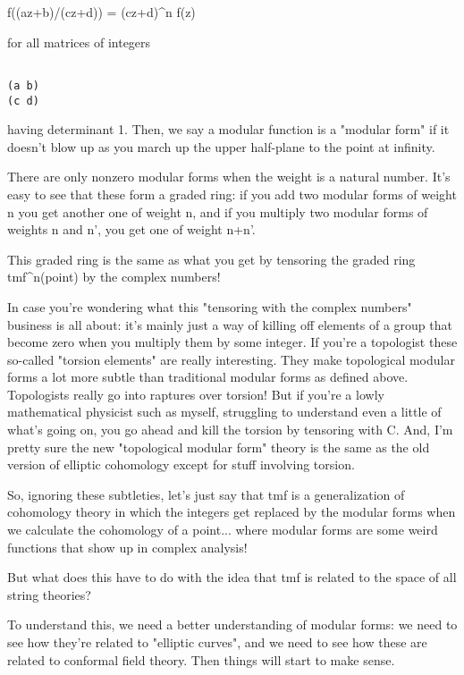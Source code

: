 f((az+b)/(cz+d)) = (cz+d)^{n} f(z)
$$
    
for all matrices of integers


\begin{verbatim}

(a b) 
(c d)
\end{verbatim}
    
having determinant 1.  Then, we say a modular function is a
"modular form" if it doesn't blow up as you march up
the upper half-plane to the point at infinity.  

There are only nonzero modular forms when the weight
is a natural number.  It's easy to see that these form a
graded ring: if you add two modular forms of weight n 
you get another one of weight n, and if you multiply two
modular forms of weights n and n', you get one of weight n+n'. 

This graded ring is the same as what you get by tensoring the 
graded ring tmf^{n}(point) by the complex numbers!

In case you're wondering what this "tensoring with the complex 
numbers" business is all about: it's mainly just a way of killing 
off elements of a group that become zero when you multiply them by 
some integer.  If you're a topologist these so-called "torsion 
elements" are really interesting.  They make topological modular
forms a lot more subtle than traditional modular forms as defined 
above.  Topologists really go into raptures over torsion!  But if 
you're a lowly mathematical physicist such as myself, struggling to 
understand even a little of what's going on, you go ahead and kill 
the torsion by tensoring with C.  And, I'm pretty sure the new
"topological modular form" theory is the same as the old version
of elliptic cohomology except for stuff involving torsion.

So, ignoring these subtleties, let's just say that tmf is a 
generalization of cohomology theory in which the integers get 
replaced by the modular forms when we calculate the cohomology 
of a point... where modular forms are some weird functions that 
show up in complex analysis! 

But what does this have to do with the idea that tmf is related
to the space of all string theories?

To understand this, we need a better understanding of modular forms: 
we need to see how they're related to "elliptic curves", 
and we need to see how these are related to conformal field theory.  
Then things will start to make sense.    

